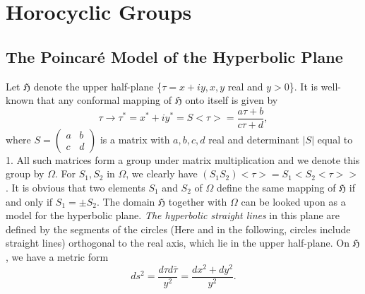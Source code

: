 \chapter{Horocyclic Groups}\label{chap1}

\section{The Poincar\'e Model of the Hyperbolic Plane}\label{chap1:sec1}\pageoriginale

Let $\mathfrak{H}$ denote the upper half-plane \{$\tau=x+iy, x, y$
real and $y>0$\}. It is well-known that any conformal mapping of
$\mathfrak{H}$ onto itself is given by
\begin{equation*}
\tau \to \tau^{\ast} = x^{\ast} + iy^{\ast} = S<\tau > =
\frac{a\tau+b}{c\tau+d}, \tag{1}\label{eq1:1}
\end{equation*}
where $S=\left(\begin{smallmatrix} a&b\\c&d\end{smallmatrix}\right)$
  is a matrix with $a, b, c, d$ real and determinant $|S|$ equal to
  1. All such matrices form a group under matrix multiplication and we
  denote this group by $\Omega$. For $S_1, S_2$ in $\Omega$, we
  clearly have $(S_1S_2)<\tau> = S_1 < S_2 <\tau>>$. It is obvious
  that two elements $S_1$ and $S_2$ of $\Omega$ define the same
  mapping of $\mathfrak{H}$ if and only if $S_1 =\pm S_2$. The domain
  $\mathfrak{H}$ together with $\Omega$ can be looked upon as a model
  for the hyperbolic plane. \textit{The hyperbolic straight lines} in
  this plane are defined by the segments of the circles (Here and in
  the following, circles include straight lines) orthogonal to the
  real axis, which lie in the upper half-plane. On $\mathfrak{H}$, we
  have a metric form
\begin{equation*}
ds^2 = \frac{d\tau d\bar{\tau}}{y^2} = 
\frac{dx^2+dy^2}{y^2}. \tag{2}\label{eq1:2}
\end{equation*}

